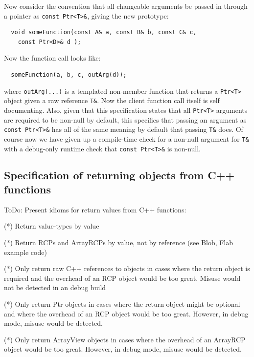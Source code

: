 Now consider the convention that all changeable arguments be passed in through
a pointer as {}\texttt{const Ptr<T>\&}, giving the new prototype:

{\small\begin{verbatim}
  void someFunction(const A& a, const B& b, const C& c,
    const Ptr<D>& d );
\end{verbatim}}

Now the function call looks like:

{\small\begin{verbatim}
  someFunction(a, b, c, outArg(d));
\end{verbatim}}

where {}\texttt{outArg(...)} is a templated non-member function that returns a
{}\texttt{Ptr<T>} object given a raw reference {}\texttt{T\&}.  Now the client
function call itself is self documenting.  Also, given that this specification
states that all {}\texttt{Ptr<T>} arguments are required to be non-null by
default, this specifies that passing an argument as {}\texttt{const Ptr<T>\&}
has all of the same meaning by default that passing {}\texttt{T\&} does.  Of
course now we have given up a compile-time check for a non-null argument for
{}\texttt{T\&} with a debug-only runtime check that {}\texttt{const Ptr<T>\&}
is non-null.


%
\subsection{Specification of returning objects from C++ functions}
\label{sec:func_arguments}
%

ToDo: Present idioms for return values from C++ functions:

(*) Return value-types by value

(*) Return RCPs and ArrayRCPs by value, not by reference (see Blob,
Flab example code)

(*) Only return raw C++ references to objects in cases where the
return object is required and the overhead of an RCP object would be
too great.  Misuse would not be detected in an debug build

(*) Only return Ptr objects in cases where the return object might be
optional and where the overhead of an RCP object would be too great.
However, in debug mode, misuse would be detected.

(*) Only return ArrayView objects in cases where the overhead of an
ArrayRCP object would be too great.  However, in debug mode, misuse
would be detected.


